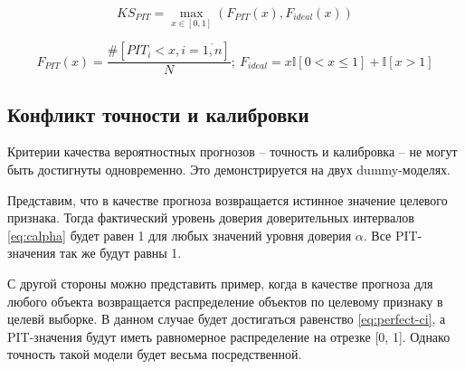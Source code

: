 \documentclass[fleqn,usenatbib]{mnras}
\begin{document}
\begin{equation}\label{eq:kspit}
    KS_{PIT} = \max_{x \in [0,1]}(F_{PIT}(x), F_{ideal}(x))
\end{equation}{}

\begin{equation}
    F_{PIT}(x) = \frac{\#[PIT_i < x, i=\overline{1,n}]}{N}; ~ F_{ideal} = x\mathbb{I}[0 < x \leq 1] + \mathbb{I}[x > 1]
\end{equation}{}

\subsection{Конфликт точности и калибровки}\label{sec:quality-conflict}
Критерии качества вероятностных прогнозов -- точность и калибровка -- не могут быть достигнуты одновременно. Это демонстрируется на двух dummy-моделях.

Представим, что в качестве прогноза возвращается истинное значение целевого признака. Тогда фактический уровень доверия доверительных интервалов \eqref{eq:calpha} будет равен 1 для любых значений уровня доверия $\alpha$. Все PIT-значения так же будут равны 1.

С другой стороны можно представить пример, когда в качестве прогноза для любого объекта возвращается распределение объектов по целевому признаку в целевй выборке. В данном случае будет достигаться равенство \eqref{eq:perfect-ci}, а PIT-значения будут иметь равномерное распределение на отрезке [0, 1]. Однако точность такой модели будет весьма посредственной.




\end{document}
